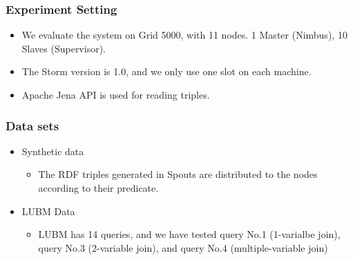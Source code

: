 \begin{frame}
\frametitle{Experiment Setting}
\begin{itemize}
\item We evaluate the system on Grid 5000, with 11 nodes. 1 Master (Nimbus), 10 Slaves (Supervisor). 

\item The Storm version is 1.0, and we only use one slot on each machine.

\item Apache Jena API is used for reading triples.
\end{itemize}

\end{frame}

\begin{frame}
\frametitle{Data sets}
\begin{itemize}
\item Synthetic data
\begin{itemize}
\item The RDF triples generated in Spouts are distributed to the nodes according to their predicate. 
\end{itemize}
\item LUBM Data 
\begin{itemize}
\item LUBM has 14 queries, and we have tested query No.1 (1-varialbe join), query No.3 (2-variable join), and query No.4 (multiple-variable join)
\end{itemize}
\end{itemize}
\end{frame}

